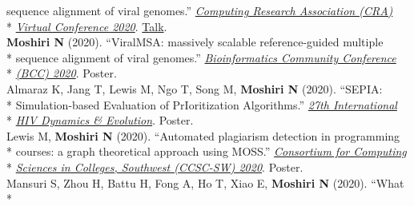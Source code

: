 \documentclass[margin,line]{res}
\begin{document}
\begin{resume}
\hspace*{9.5mm} sequence alignment of viral genomes.'' \href{https://cra.org/events/cra-virtual-conference-2020/}{\textit{Computing Research Association (CRA)}}\\*\vspace{2mm}
\hspace*{8mm} \href{https://cra.org/events/cra-virtual-conference-2020/}{\textit{Virtual Conference 2020}}. \href{https://www.youtube.com/watch?v=PrAoks7OhE8&list=PL6AeXx75lHyyqKgfRmlSM4QUEna0dWDza&index=9&t=0s}{Talk}.\\
\hspace*{4mm} \textbf{Moshiri N} (2020). ``ViralMSA: massively scalable reference-guided multiple\\*
\hspace*{9.5mm} sequence alignment of viral genomes.'' \href{https://bcc2020.github.io/}{\textit{Bioinformatics Community Conference}}\\*\vspace{2mm}
\hspace*{8mm} \href{https://bcc2020.github.io/}{\textit{(BCC) 2020}}. Poster.\\
\hspace*{4mm} Almaraz K, Jang T, Lewis M, Ngo T, Song M, \textbf{Moshiri N} (2020). ``SEPIA:\\*
\hspace*{9.5mm} Simulation-based Evaluation of PrIoritization Algorithms.'' \href{https://cme.ucsd.edu/hivdynamics/}{\textit{27th International}}\\*\vspace{2mm}
\hspace*{8mm} \href{https://cme.ucsd.edu/hivdynamics/}{\textit{HIV Dynamics \& Evolution}}. Poster.\\
\hspace*{4mm} Lewis M, \textbf{Moshiri N} (2020). ``Automated plagiarism detection in programming\\*
\hspace*{9.5mm} courses: a graph theoretical approach using MOSS.'' \href{http://ccsc.org/southwestern/2020/index.php}{\textit{Consortium for Computing}}\\*\vspace{2mm}
\hspace*{8mm} \href{http://ccsc.org/southwestern/2020/index.php}{\textit{Sciences in Colleges, Southwest (CCSC-SW) 2020}}. Poster.\\
\hspace*{4mm} Mansuri S, Zhou H, Battu H, Fong A, Ho T, Xiao E, \textbf{Moshiri N} (2020). ``What\\*

\end{resume}
\end{document}
